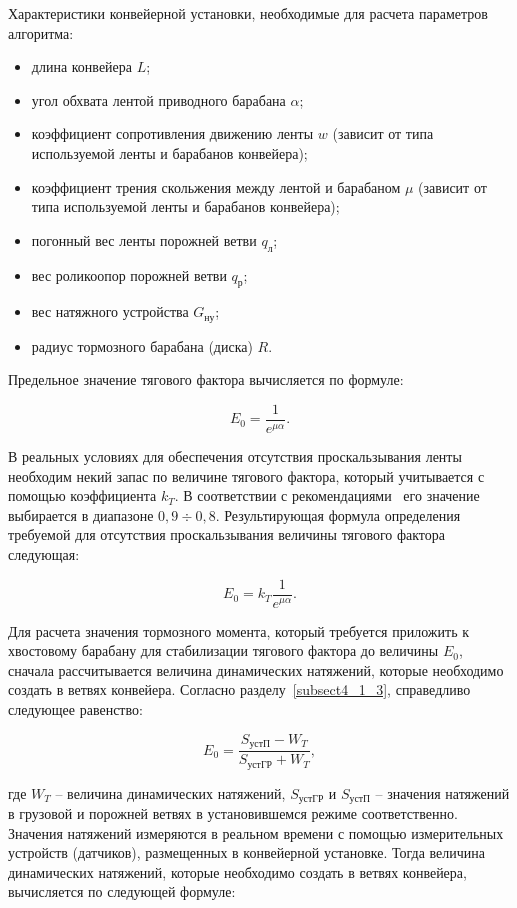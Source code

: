 Характеристики конвейерной установки, необходимые для расчета параметров алгоритма:
\begin{itemize}
\item длина конвейера $ L $;
\item угол обхвата лентой приводного барабана $ \alpha $;
\item коэффициент сопротивления движению ленты $ w $ (зависит от типа используемой ленты и барабанов конвейера);
\item коэффициент трения скольжения между лентой и барабаном $\mu $ (зависит от типа используемой ленты и барабанов конвейера);
\item погонный вес ленты порожней ветви $ q_\text{л} $;
\item вес роликоопор порожней ветви $ q_\text{р} $;
\item вес натяжного устройства $ G_\text{ну} $;
\item радиус тормозного барабана (диска) $ R $.
\end{itemize}

Предельное значение тягового фактора вычисляется по формуле:

$$ E_0 = \frac{1}{e^{\mu \alpha}}. $$

В реальных условиях для обеспечения отсутствия проскальзывания ленты необходим некий запас по величине тягового фактора, который учитывается с помощью коэффициента $ k_T $. В соответствии с рекомендациями~\cite{vdmitriev} его значение выбирается в диапазоне $ 0,9 \div 0,8 $. Результирующая формула определения требуемой для отсутствия проскальзывания величины тягового фактора следующая:

\begin{equation}
\label{eq:4.5.e}
E_0 = k_T \frac{1}{e^{\mu \alpha}}.
\end{equation}

Для расчета значения тормозного момента, который требуется приложить к хвостовому барабану для стабилизации тягового фактора до величины $ E_0 $, сначала рассчитывается величина динамических натяжений, которые необходимо создать в ветвях конвейера. Согласно разделу~\ref{subsect4_1_3}, справедливо следующее равенство:

$$ E_0 = \frac{S_\text{устП} - W_T}{S_\text{устГР} + W_T}, $$

где $ W_T $ -- величина динамических натяжений, $ {S_\text{устГР}} $ и $ {S_\text{устП}} $ -- значения натяжений в грузовой и порожней ветвях в установившемся режиме соответственно. Значения натяжений измеряются в реальном времени с помощью измерительных устройств (датчиков), размещенных в конвейерной установке. Тогда величина динамических натяжений, которые необходимо создать в ветвях конвейера, вычисляется по следующей формуле:

